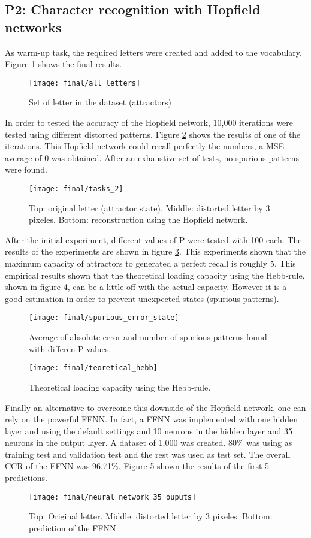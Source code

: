 \subsection{P2: Character recognition with Hopfield networks}
As warm-up task, the required letters were created and added to the vocabulary. Figure \ref{all_letter} shows the final results.

\begin{figure}[!htbp]
\caption{Set of letter in the dataset (attractors)}
\label{all_letter}
\medbreak
\texttt{[image: final/all\_letters]}
\centering
\end{figure}

In order to tested the accuracy of the Hopfield network, 10,000 iterations were tested using different distorted patterns. Figure \ref{final_3_1} shows the results of one of the iterations. This Hopfield network could recall perfectly the numbers, a MSE average of 0 was obtained. After an exhaustive set of tests, no spurious patterns were found. 

\begin{figure}[!htbp]
\caption{Top: original letter (attractor state). Middle: distorted letter by 3 pixeles. Bottom: reconstruction using the Hopfield network.}
\label{final_3_1}
\medbreak
\texttt{[image: final/tasks\_2]}
\centering
\end{figure}

After the initial experiment, different values of P were tested with 100 each. The results of the experiments are shown in figure \ref{spurious_error_state}. This experiments shown that the maximum capacity of attractors to generated a perfect recall is roughly 5. This empirical results shown that the theoretical loading capacity using the Hebb-rule, shown in figure \ref{teoretical_hebb}, can be a little off with the actual capacity. However it is a good estimation in order to prevent unexpected states (spurious patterns).


\begin{figure}[!htbp]
\caption{Average of absolute error and number of spurious patterns found with differen P values.}
\label{spurious_error_state}
\medbreak
\texttt{[image: final/spurious\_error\_state]}
\centering
\end{figure}

\begin{figure}[!htbp]
\caption{Theoretical loading capacity using the Hebb-rule.}
\label{teoretical_hebb}
\medbreak
\texttt{[image: final/teoretical\_hebb]}
\centering
\end{figure}
\bigbreak
Finally an alternative to overcome this downside of the Hopfield network, one can rely on the powerful FFNN. In fact, a FFNN was implemented with one hidden layer and using the default settings and 10 neurons in the hidden layer and 35 neurons in the output layer. A dataset of 1,000 was created. 80\% was using as training test and validation test and the rest was used as test set. The overall CCR of the FFNN was 96.71\%. Figure \ref{neural_network_35_ouputs} shown the results of the first 5 predictions.

\begin{figure}[!htbp]
\caption{Top: Original letter. Middle: distorted letter by 3 pixeles. Bottom: prediction of the FFNN.}
\label{neural_network_35_ouputs}
\medbreak
\texttt{[image: final/neural\_network\_35\_ouputs]}
\centering
\end{figure}
